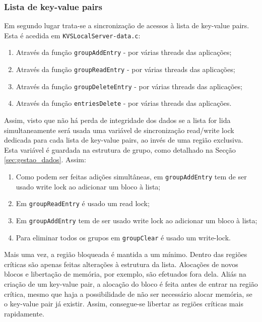 \subsubsection{Lista de key-value pairs}
Em segundo lugar trata-se a sincronização de acessos à lista de key-value pairs. Esta é acedida em \texttt{KVSLocalServer-data.c}:
\begin{enumerate}[noitemsep]
\item Através da função \texttt{groupAddEntry} - por várias threads das aplicações;
\item Através da função \texttt{groupReadEntry} - por várias threads das aplicações;
\item Através da função \texttt{groupDeleteEntry} - por várias threads das aplicações;
\item Através da função \texttt{entriesDelete} - por várias threads das aplicações.
\end{enumerate}

Assim, visto que não há perda de integridade dos dados se a lista for lida simultaneamente será usada uma variável de sincronização read/write lock dedicada para cada lista de key-value pairs, ao invés de uma região exclusiva. Esta variável é guardada na estrutura de grupo, como detalhado na Secção \ref{sec:gestao_dados}. Assim:
\begin{enumerate}[noitemsep]
    \item Como podem ser feitas adições simultâneas, em \texttt{groupAddEntry} tem de ser usado write lock ao adicionar um bloco à lista;
    \item Em \texttt{groupReadEntry} é usado um read lock;
    \item Em \texttt{groupAddEntry} tem de ser usado write lock ao adicionar um bloco à lista;
   \item Para eliminar todos os grupos em  \texttt{groupClear} é usado um write-lock.
\end{enumerate}

Mais uma vez, a região bloqueada é mantida a um mínimo. Dentro das regiões críticas são apenas feitas alterações à estrutura da lista. Alocações de novos blocos e libertação de memória, por exemplo, são efetuados fora dela. Aliás na criação de um key-value pair, a alocação do bloco é feita antes de entrar na região crítica, mesmo que haja a possibilidade de não ser necessário alocar memória, se o key-value pair já existir. Assim, consegue-se libertar as regiões críticas mais rapidamente.

